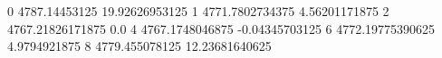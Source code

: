 0 4787.14453125 19.92626953125
1 4771.7802734375 4.56201171875
2 4767.21826171875 0.0
4 4767.1748046875 -0.04345703125
6 4772.19775390625 4.9794921875
8 4779.455078125 12.23681640625
